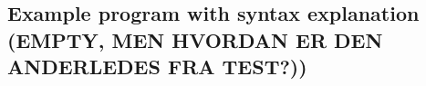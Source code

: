 \subsection{Example program with syntax explanation (EMPTY, MEN HVORDAN ER DEN ANDERLEDES FRA TEST?))}
